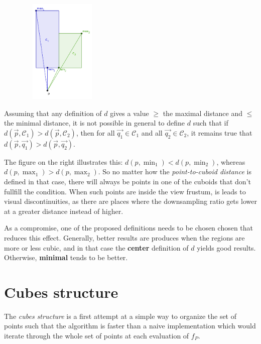 \documentclass[a4paper,10pt,abstracton,notitlepage]{scrreprt}
\begin{document}
\begin{figure}
\includegraphics[width=4cm,height=5cm]{minMaxDistance.png}
\label{fig:min_max_c_d}
\end{figure}
Assuming that any definition of $d$ gives a value $\geq$ the maximal distance and $\leq$ the minimal distance, it is not possible in general to define $d$ such that if $d(\overrightarrow{p}, \mathcal{C_{1}}) > d(\overrightarrow{p}, \mathcal{C_{2}})$, then for all $\overrightarrow{q_{1}} \in \mathcal{C_{1}}$ and all $\overrightarrow{q_{2}} \in \mathcal{C_{2}}$, it remains true that $d(\overrightarrow{p}, \overrightarrow{q_{1}}) > d(\overrightarrow{p}, \overrightarrow{q_{2}})$. 

The figure on the right illustrates this: $d(p, \min_{1}) < d(p, \min_{2})$, whereas $d(p, \max_{1}) > d(p, \max_{2})$. So no matter how the \emph{point-to-cuboid distance} is defined in that case, there will always be points in one of the cuboids that don't fullfill the condition. When such points are inside the view frustum, is leads to visual discontinuities, as there are places where the downsampling ratio gets lower at a greater distance instead of higher.

As a compromise, one of the proposed definitions needs to be chosen chosen that reduces this effect. Generally, better results are produces when the regions are more or less cubic, and in that case the \textbf{center} definition of $d$ yields good results. Otherwise, \textbf{minimal} tends to be better.

\pagebreak

\section{Cubes structure}
The \emph{cubes structure} is a first attempt at a simple way to organize the set of points such that the algorithm is faster than a naive implementation which would iterate through the whole set of points at each evaluation of $f_{P}$.
\end{document}
